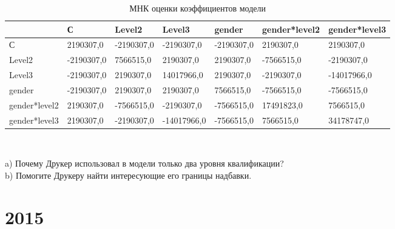 \documentclass[addpoints, answers]{exam} %
\begin{document}
\begin{questions}
\begin{parts}
\begin{table}[H]
\caption{МНК оценки коэффициентов модели}
\begin{tabular}{|m{2cm}|m{2cm}|m{2cm}|m{2cm}|m{2cm}|m{2cm}|m{2cm}|}
  \hline
     &    С  &  Level2  &  Level3  &   gender &   gender*level2 & gender*level3\\  
  \hline
  С  &  2190307,0 &  -2190307,0&  -2190307,0  &  -2190307,0 &  2190307,0 &  2190307,0\\  
   \hline
   Level2 &-2190307,0  &  7566515,0& 2190307,0  & 2190307,0  & -7566515,0  &  -2190307,0\\ 
   \hline
    Level3&-2190307,0  &  2190307,0 &  14017966,0 & 2190307,0  &-2190307,0   &  -14017966,0\\
   \hline
    gender&-2190307,0   &  2190307,0&  2190307,0 &  7566515,0 &  -7566515,0 &  -7566515,0\\
   \hline
    gender*level2& 2190307,0 & -7566515,0   &  -2190307,0&  -7566515,0 &  17491823,0 &  7566515,0\\
   \hline
    gender*level3& 2190307,0 & -2190307,0   &  -14017966,0&  -7566515,0 &  7566515,0 &  34178747,0\\ 
   \hline
\end{tabular} \\
\end{table}

a) Почему Друкер использовал в модели только два уровня квалификации?\\
b) Помогите Друкеру найти интересующие его границы надбавки.
\end{parts}
\end{questions}
\newpage
\section{2015}
\end{document}
